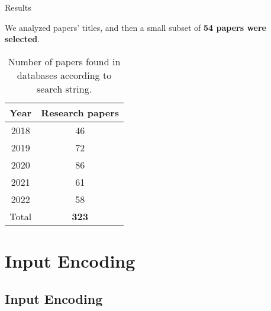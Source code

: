 \documentclass[10pt]{beamer}
\newcommand{\1}{
	\setbeamertemplate{background}{
		\texttt{[image: img/1]}
		\tikz[overlay] \fill[fill opacity=0.75,fill=white] (0,0) rectangle (-\paperwidth,\paperheight);
	}
}
\begin{document}
\begin{frame}{Results}{}

We analyzed papers' titles, and then  a small subset of \textbf{54 papers were selected}.

	\begin{table}[H]
		\begin{center}
			\caption{Number of papers found in databases according to search string. }
			\label{tab:number_papers}
			\setlength{\tabcolsep}{0.5em} %
			{\renewcommand{\arraystretch}{1.2}%
				\begin{tabular}{cc}
					\textbf{Year} & \textbf{Research papers} \\ \hline
					2018 & 46  \\
					2019 & 72  \\
					2020 & 86  \\
					2021 & 61  \\
					2022 & 58  \\ \hline
					Total & \textbf{323} \\
				\end{tabular}
			}
		\end{center}
	\end{table}
	
\end{frame}


\section{Input Encoding}


\subsection{Input Encoding}
\end{document}
